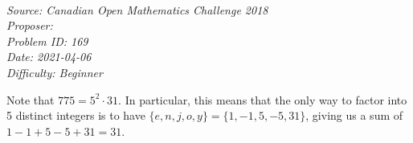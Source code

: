 \SSbreak\\
\emph{Source: Canadian Open Mathematics Challenge 2018}\\
\emph{Proposer: \Pnjoy}\\ %
\emph{Problem ID: 169}\\
\emph{Date: 2021-04-06}\\
\emph{Difficulty: Beginner}\\
\SSbreak

\bigskip

\begin{solution}\hfil\medskip
	
	Note that \(775 = 5^2 \cdot 31\). In particular, this means that the only way to factor into 5 distinct integers is to have \( \{e, n, j, o, y\} = \{1, -1, 5, -5, 31\} \), giving us a sum of \(1 - 1 + 5 - 5 + 31 = \boxed{31}\). 
\end{solution}\bigskip


